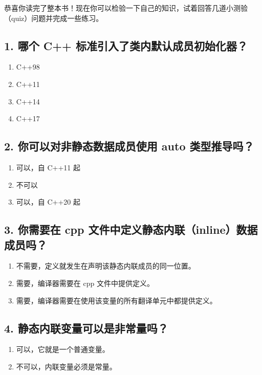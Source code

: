 恭喜你读完了整本书！现在你可以检验一下自己的知识，试着回答几道小测验（quiz）问题并完成一些练习。

\subsection{1. 哪个 C++ 标准引入了类内默认成员初始化器？}

\begin{enumerate}
\item C++98
\item C++11
\item C++14
\item C++17
\end{enumerate}

\subsection{2. 你可以对非静态数据成员使用 auto 类型推导吗？}

\begin{enumerate}
\item 可以，自 C++11 起
\item 不可以
\item 可以，自 C++20 起
\end{enumerate}

\subsection{3. 你需要在 cpp 文件中定义静态内联（inline）数据成员吗？}

\begin{enumerate}
\item 不需要，定义就发生在声明该静态内联成员的同一位置。
\item 需要，编译器需要在 cpp 文件中提供定义。
\item 需要，编译器需要在使用该变量的所有翻译单元中都提供定义。
\end{enumerate}

\subsection{4. 静态内联变量可以是非常量吗？}

\begin{enumerate}
\item 可以，它就是一个普通变量。
\item 不可以，内联变量必须是常量。
\end{enumerate}

